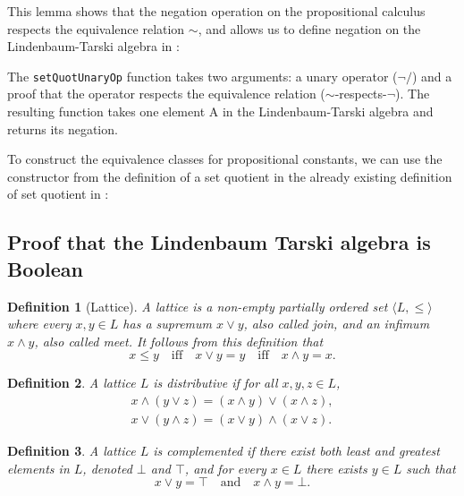 \documentclass[titlepage]{article}
\newtheorem{definition}{Definition}[section]
\begin{document}
This lemma shows that the negation operation on the propositional calculus respects the equivalence relation $\sim$, and allows us to define negation on the Lindenbaum-Tarski algebra in \Agda:


The \texttt{setQuotUnaryOp} function takes two arguments: a unary operator ($\neg/$) and a proof that the operator respects the equivalence relation ($\sim$-respects-$\neg$). The resulting function takes one element A in the Lindenbaum-Tarski algebra and returns its negation.

To construct the equivalence classes for propositional constants, we can use the constructor from the definition of a set quotient in the already existing definition of set quotient in \CubicalAgda:



\subsection{Proof that the Lindenbaum Tarski algebra is Boolean}

\begin{definition}[Lattice]
    A lattice is a non-empty partially ordered set $\langle L, \leq \rangle$ where every $x,y \in L$ has a supremum $x\vee y$, also called join, and an infimum $x \wedge y$, also called meet. It follows from this definition that
    $$x \leq y \quad \text{iff} \quad x \vee y = y \quad \text{iff} \quad x \wedge y = x.$$
\end{definition}

\begin{definition}
    A lattice $L$ is distributive if for all $x,y,z \in L$,
    \begin{align*}
        x \wedge (y \vee z) = (x \wedge y) \vee (x \wedge z), \\
        x \vee (y \wedge z) = (x \vee y) \wedge (x \vee z).
    \end{align*}
\end{definition}

\begin{definition}
    A lattice $L$ is complemented if there exist both least and greatest elements in $L$, denoted $\bot$ and $\top$, and for every $x\in L$ there exists $y\in L$ such that
    $$x \vee y = \top \quad \text{and} \quad x\wedge y = \bot.$$
\end{definition}
\end{document}
